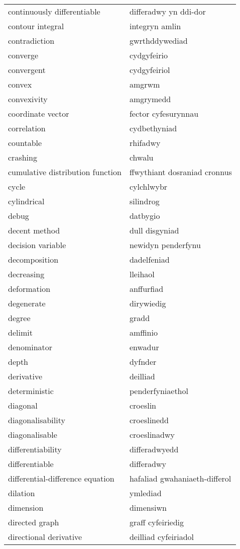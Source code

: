 \begin{supertabular}{p{0.22\textwidth}p{0.22\textwidth}}
continuously differentiable & differadwy yn ddi-dor \\
contour integral & integryn amlin \\
contradiction & gwrthddywediad \\
converge & cydgyfeirio \\
convergent & cydgyfeiriol \\
convex & amgrwm \\
convexivity & amgrymedd \\
coordinate vector & fector cyfesurynnau \\
correlation & cydbethyniad \\
countable & rhifadwy \\
crashing & chwalu \\
cumulative distribution function & ffwythiant dosraniad cronnus \\
cycle & cylchlwybr \\
cylindrical & silindrog \\
debug & datbygio \\
decent method & dull disgyniad \\
decision variable & newidyn penderfynu \\
decomposition & dadelfeniad \\
decreasing & lleihaol \\
deformation & anffurfiad \\
degenerate & dirywiedig \\
degree & gradd \\
delimit & amffinio \\
denominator & enwadur \\
depth & dyfnder \\
derivative & deilliad \\
deterministic & penderfyniaethol \\
diagonal & croeslin \\
diagonalisability & croeslinedd \\
diagonalisable & croeslinadwy \\
differentiability & differadwyedd \\
differentiable & differadwy \\
differential-difference equation & hafaliad gwahaniaeth-differol \\
dilation & ymlediad \\
dimension & dimensiwn \\
directed graph & graff cyfeiriedig \\
directional derivative & deilliad cyfeiriadol \\

\end{supertabular}
